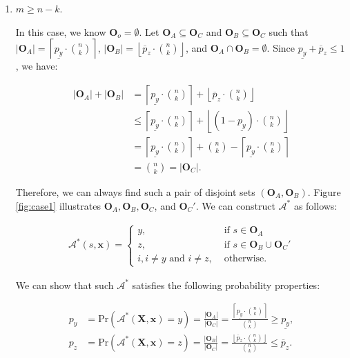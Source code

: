 \documentclass[letterpaper]{article} %
\begin{document}
\begin{enumerate}[label={\bfseries Case \arabic*:}, wide=0pt]


\item $m\ge n-k$.

In this case, we know $\mathbf{O}_o=\emptyset$.
Let $\mathbf{O}_A \subseteq \mathbf{O}_C$ and $\mathbf{O}_B \subseteq \mathbf{O}_C$ such that $|\mathbf{O}_A|=\left\lceil\underline{p_y} \cdot {n \choose k}\right\rceil$, $|\mathbf{O}_B|=\left\lfloor\overline{p}_z \cdot {n \choose k}\right\rfloor$, and $\mathbf{O}_A\cap\mathbf{O}_B=\emptyset$. Since $\underline{p_y} + \overline{p}_z \leq 1$, we have:

\begin{align}
	|\mathbf{O}_A| + |\mathbf{O}_B| &= \left\lceil\underline{p_y} \cdot {n \choose k}\right\rceil + \left\lfloor\overline{p}_z \cdot {n \choose k}\right\rfloor \\
									&\le \left\lceil\underline{p_y} \cdot {n \choose k}\right\rceil + \left\lfloor(1-\underline{p_y})\cdot {n \choose k}\right\rfloor \\
									&= \left\lceil\underline{p_y} \cdot {n \choose k}\right\rceil +  {n \choose k} - \left\lceil\underline{p_y} \cdot {n \choose k}\right\rceil \\
									&= {n \choose k}=|\mathbf{O}_C|.
\end{align}

Therefore, we can always find such a pair of disjoint sets $(\mathbf{O}_A, \mathbf{O}_B)$. Figure \ref{fig:case1} illustrates $\mathbf{O}_A, \mathbf{O}_B,\mathbf{O}_C$, and $\mathbf{O}_C'$.
We can construct $\mathcal{A}^*$ as follows:

\begin{align}
		\mathcal{A}^*(s,\mathbf{x})=
		\begin{cases}
 			y, &\text{ if } s\in \mathbf{O}_A\\
			z, &\text{ if } s\in \mathbf{O}_B\cup\mathbf{O}_C'\\
 			i, i\neq y \text{ and } i\neq z, &\text{ otherwise}.
		\end{cases}
\end{align}

We can show that such $\mathcal{A}^*$ satisfies the following probability properties:

\begin{align}
	p_y &= \text{Pr}(\mathcal{A}^*(\mathbf{X},\mathbf{x})=y) = \frac{|\mathbf{O}_A|}{|\mathbf{O}_C|} = \frac{\left\lceil\underline{p_y} \cdot {n \choose k}\right\rceil}{{n \choose k}}\ge \underline{p_y},\\
	p_z &= \text{Pr}(\mathcal{A}^*(\mathbf{X},\mathbf{x})=z) = \frac{|\mathbf{O}_B|}{|\mathbf{O}_C|} = \frac{\left\lfloor\overline{p}_z \cdot {n \choose k}\right\rfloor}{{n \choose k}} \le\overline{p}_z.
\end{align}


\end{enumerate}
\end{document}
